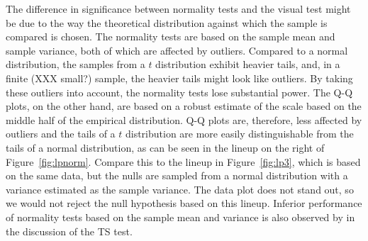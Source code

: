 \documentclass[12pt]{article}\usepackage[]{graphicx}\usepackage[]{color}
\newcommand{\al}[1]{{\color{ForestGreen} #1}}
\newcommand{\alnote}[1]{\todo[inline,color=green!40]{#1}}
\begin{document}
The difference in significance between normality tests and the visual test might be due to the way the theoretical distribution against which the sample is compared is chosen. The normality tests are based on the sample mean and sample variance, both of which are affected by outliers. Compared to a normal distribution, the samples from a $t$ distribution exhibit heavier tails, and, in a finite \al{(XXX small?)} sample, the heavier tails might look like outliers. By taking these outliers into account, the normality tests lose substantial power. The Q-Q plots, on the other hand, are based on a robust estimate of the scale based on the middle half of the empirical distribution. Q-Q plots are, therefore, less affected by outliers and the tails of a $t$ distribution are more easily distinguishable from the tails of a normal distribution, as can be seen in the lineup on the right of Figure~\ref{fig:lpnorm}. Compare this to the lineup in Figure~\ref{fig:lp3}, which is based on the same data, but the nulls are sampled from a normal distribution with a variance estimated as the sample variance. The data plot does not stand out, so we would not reject the null hypothesis based on this lineup. 
Inferior performance of normality tests based on the sample mean and variance is also observed by \cite{buja:2013} in the discussion of the TS test. 


\end{document}

